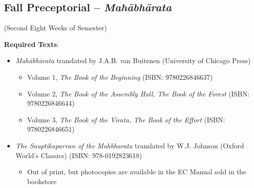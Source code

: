 \documentclass{article}
\newcounter{cntSemester} %
\begin{document}

\clearpage


\begin{center}
	\section{Fall Preceptorial -- \emph{Mahābhārata}}
	 (Second Eight Weeks of Semester)
\end{center}

\textbf{Required Texts}:
\begin{itemize}
	\item \textit{Mahābhārata} translated by J.A.B. van Buitenen (University of Chicago Press)
	      \begin{itemize}
		      \item Volume 1, \textit{The Book of the Beginning} (ISBN: 9780226846637)
		      \item Volume 2, \textit{The Book of the Assembly Hall, The Book of the Forest} (ISBN: 9780226846644)
		      \item Volume 3, \textit{The Book of the Virata, The Book of the Effort} (ISBN: 9780226846651)
	      \end{itemize}
	\item \textit{The Sauptikaparvan of the Mahbharata} translated by W.J. Johnson (Oxford World’s Classics) (ISBN: 978-0192823618)
	      \begin{itemize}
		      \item Out of print, but photocopies are available in the EC Manual sold in the bookstore
	      \end{itemize}
\end{itemize}
\end{document}
